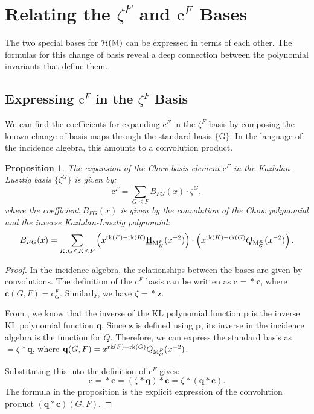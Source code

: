 \documentclass[11pt]{article}
\newcommand{\calH}{\mathcal{H}}
\newcommand{\chow}{\normalfont\text{\underline{H}}}
\newcommand{\rank}{\normalfont\text{rk}}
\newcommand{\M}{\normalfont\text{M}}
\newcommand{\Ebasis}[1]{\mathrm{#1}}
\newcommand{\Cbasis}[1]{\mathrm{c}^{#1}}
\newcommand{\CbasisSub}[2]{\mathrm{c}^{#1}_{#2}}
\newcommand{\Zbasis}[1]{\zeta^{#1}}
\newtheorem{proposition}[theorem]{Proposition}
\theoremstyle{remark}
\begin{document}
\section{Relating the \(\Zbasis{F}\) and \(\Cbasis{F}\) Bases}

The two special bases for \(\calH(\M)\) can be expressed in terms of each other. The formulas for this change of basis reveal a deep connection between the polynomial invariants that define them.

\subsection{Expressing \(\Cbasis{F}\) in the \(\Zbasis{F}\) Basis}
We can find the coefficients for expanding \(\Cbasis{F}\) in the \(\Zbasis{F}\) basis by composing the known change-of-basis maps through the standard basis \(\{\Ebasis{G}\}\). In the language of the incidence algebra, this amounts to a convolution product.

\begin{proposition}
The expansion of the Chow basis element \(\Cbasis{F}\) in the Kazhdan-Lusztig basis \(\{\Zbasis{G}\}\) is given by:
\[ \Cbasis{F} = \sum_{G \le F} B_{FG}(x) \cdot \Zbasis{G}, \]
where the coefficient \(B_{FG}(x)\) is given by the convolution of the Chow polynomial and the inverse Kazhdan-Lusztig polynomial:
\[ B_{FG}(x) = \sum_{K: G \le K \le F} \left( x^{\rank(F)-\rank(K)}\chow_{\M_K^F}(x^{-2}) \right) \cdot \left( x^{\rank(K)-\rank(G)}Q_{\M_G^K}(x^{-2}) \right). \]
\end{proposition}
\begin{proof}
    In the incidence algebra, the relationships between the bases are given by convolutions. The definition of the \(\Cbasis{F}\) basis can be written as \(\Cbasis{} = \Ebasis{} * \mathbf{c}\), where \(\mathbf{c}(G,F) = \CbasisSub{F}{G}\). Similarly, we have \(\Zbasis{} = \Ebasis{} * \mathbf{z}\).

    From \cite{gx-inversekazhdanlustig}, we know that the inverse of the KL polynomial function \(\mathbf{p}\) is the inverse KL polynomial function \(\mathbf{q}\). Since \(\mathbf{z}\) is defined using \(\mathbf{p}\), its inverse in the incidence algebra is the function for \(Q\). Therefore, we can express the standard basis as \(\Ebasis{} = \Zbasis{} * \mathbf{q}\), where \(\mathbf{q}(G,F) = x^{\rank(F)-\rank(G)}Q_{\M_G^F}(x^{-2})\).

    Substituting this into the definition of \(\Cbasis{F}\) gives:
    \[ \Cbasis{} = \Ebasis{} * \mathbf{c} = (\Zbasis{} * \mathbf{q}) * \mathbf{c} = \Zbasis{} * (\mathbf{q} * \mathbf{c}). \]
    The formula in the proposition is the explicit expression of the convolution product \((\mathbf{q} * \mathbf{c})(G,F)\).
\end{proof}
\end{document}
